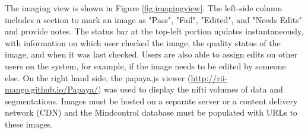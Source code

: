 The imaging view is shown in Figure \ref{fig:imagingview}. The left-side column includes a section to mark an image as "Pass", "Fail", "Edited", and "Needs Edits" and provide notes. The status bar at the top-left portion updates instantaneously, with information on which user checked the image, the quality status of the image, and when it was last checked. Users are also able to assign edits on other users on the system, for example, if the image needs to be edited by someone else. On the right hand side, the papaya.js viewer (\href{http://rii-mango.github.io/Papaya/}{http://rii-mango.github.io/Papaya/}) was used to display the nifti volumes of data and segmentations. Images must be hosted on a separate server or a content delivery network (CDN) and the Mindcontrol database must be populated with URLs to these images.
